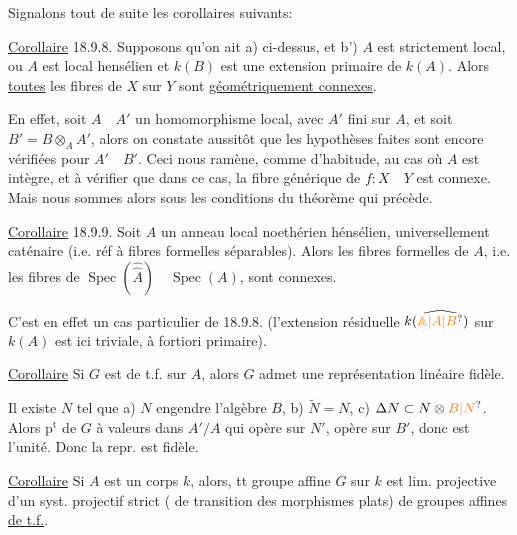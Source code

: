 Signalons tout de suite les corollaires suivants:

\uline{Corollaire} 18.9.8. Supposons qu'on ait a) ci-dessus, et b') $A$ est strictement local, ou $A$ est local hensélien et $k(B)$ est une extension primaire de $k(A)$. Alors \uline{toutes} les fibres de $X$ sur $Y$ sont \uline{géométriquement connexes}.

En effet, soit $A\quad A'$ un homomorphisme local, avec $A'$ fini sur $A$, et soit $B'=B\otimes_A A'$, alors on constate aussitôt que les hypothèses faites sont encore vérifiées pour $A'\quad B'$. Ceci nous ramène, comme d'habitude, au cas où $A$ est intègre, et à vérifier que dans ce cas, la fibre générique de $f:X\quad Y$ est connexe. Mais nous sommes alors sous les conditions du théorème qui précède.

\uline{Corollaire} 18.9.9. Soit $A$ un anneau local noethérien hénsélien,  universellement caténaire (i.e. réf \quad à fibres formelles séparables). Alors les fibres formelles de $A$, i.e. les fibres de $\operatorname{Spec}(\hat{\hat A})\quad\operatorname{Spec}(A)$, sont  connexes.

C'est en effet un cas particulier de 18.9.8. (l'extension résiduelle $k(\widehat{\unsure{\mathbb A|A|B}})$ sur $k(A)$ est ici triviale, à fortiori primaire).

\margin{\rule{.04em}{1.5em}}\uline{Corollaire} Si  $G$ est de t.f. sur $A$, alors $G$ admet une représentation linéaire fidèle.

Il existe $N$ tel que a) $N$ engendre l'algèbre $B$, b) $\widetilde N=N$, c) $\Delta N\subset N\otimes \unsure{B|N}$.
 Alors   $\mathrm p^{\mathrm t}$ de $G$ à valeurs dans $A'/A$ qui opère  sur $N'$, opère  sur $B'$,  donc est  l'unité. Donc la repr. est fidèle.

\uline{Corollaire} Si $A$ est un corps $k$, alors, tt groupe affine  $G$ sur $k$ est lim.  projective d'un syst. projectif strict ( de transition des morphismes  plats) de groupes affines \uline{de t.f.}.

